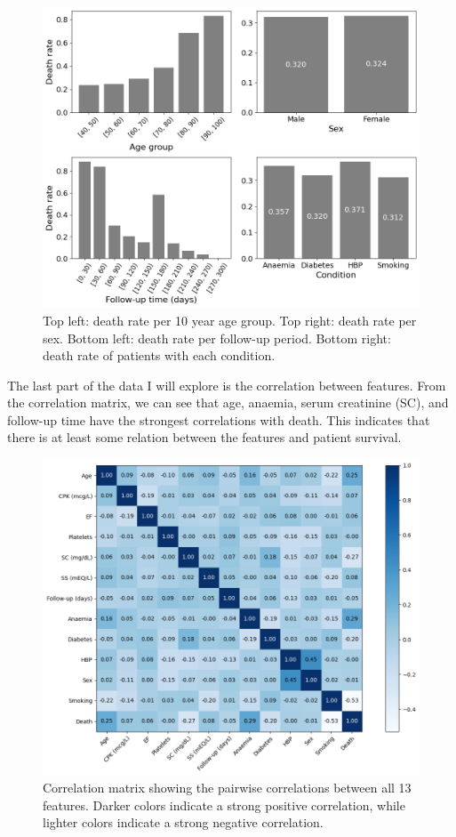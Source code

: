 \documentclass[12pt, letterpaper]{article}
\begin{document}
	\begin{figure}[H]
		\centering
		\includegraphics[width=0.70\linewidth]{figs/death_rates.png}
		\caption{Top left: death rate per 10 year age group. Top right: death rate per sex. Bottom left: death rate per follow-up period. Bottom right: death rate of patients with each condition.}
		\label{fig:death_rates}
	\end{figure}
	
	The last part of the data I will explore is the correlation between features. From the correlation matrix, we can see that age, anaemia, serum creatinine (SC), and follow-up time have the strongest correlations with death. This indicates that there is at least some relation between the features and patient survival.
	
	\begin{figure}[H]
		\centering
		\includegraphics[width=0.8\linewidth]{figs/corr_mat.png}
		\caption{Correlation matrix showing the pairwise correlations between all 13 features. Darker colors indicate a strong positive correlation, while lighter colors indicate a strong negative correlation.}
		\label{fig:corr_mat}
	\end{figure}
	
\end{document}
